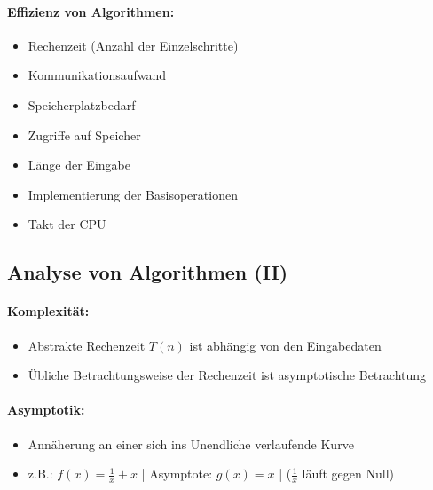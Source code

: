 \documentclass[
    ngerman,
    color=3b,
    dark_mode,
    load_common, %
    summary,
    boxarc,
]{rubos-tuda-template}
\begin{document}
\paragraph{Effizienz von Algorithmen:}
\begin{description}[leftmargin=7cm,itemsep=1em]
    \item [Effizienzfaktoren]
          \begin{itemize}
              \item Rechenzeit (Anzahl der Einzelschritte)
              \item Kommunikationsaufwand
              \item Speicherplatzbedarf
              \item Zugriffe auf Speicher
          \end{itemize}
    \item [Laufzeitfaktoren]
          \begin{itemize}
              \item Länge der Eingabe
              \item Implementierung der Basisoperationen
              \item Takt der CPU
          \end{itemize}
\end{description}
\clearpage
\subsection{Analyse von Algorithmen \textmd{(II)}}\label{Analyse von Algorithmen 2}
\paragraph{Komplexität:}
\begin{itemize}
    \item Abstrakte Rechenzeit $T(n)$ ist abhängig von den Eingabedaten
    \item Übliche Betrachtungsweise der Rechenzeit ist asymptotische Betrachtung
\end{itemize}

\paragraph{Asymptotik:}
\begin{itemize}
    \item Annäherung an einer sich ins Unendliche verlaufende Kurve
    \item z.B.: $f(x) = \frac{1}{x} + x$ | Asymptote: $g(x)=x$ | ($\frac{1}{x}$ läuft gegen Null)
\end{itemize}
\end{document}
